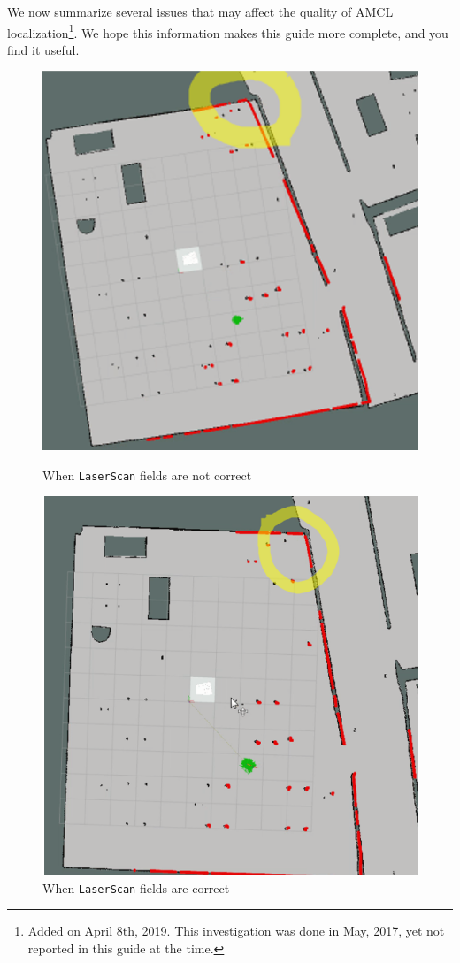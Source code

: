 \documentclass[12pt]{article}
\begin{document}
\noindent We now summarize several issues that may affect the quality of AMCL localization\footnote{Added on April 8th, 2019. This investigation was done in May, 2017, yet not reported in this guide at the time.}.  We hope this information makes this guide more complete, and you find it useful.


\begin{figure}[!tb]
    \includegraphics[width=\linewidth]{scanner1.png}
    \caption{When \texttt{LaserScan} fields are not correct}
    \label{fig:scanner1}
\endminipage\hfill
{}
  \includegraphics[width=\linewidth]{scanner2.png}
  \caption{When \texttt{LaserScan} fields are correct}
  \label{fig:scanner2}
\endminipage\hfill
\end{figure}
\end{document}
